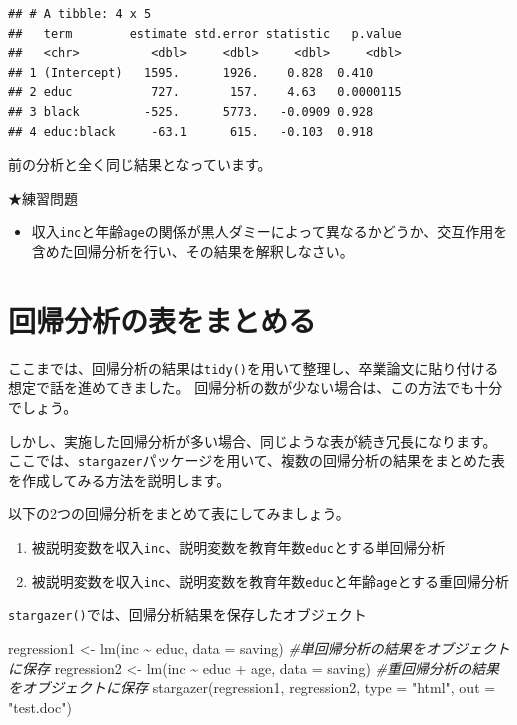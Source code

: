 \documentclass[
]{book}
\newenvironment{Shaded}{\begin{snugshade}}{\end{snugshade}}
\newcommand{\AttributeTok}[1]{\textcolor[rgb]{0.77,0.63,0.00}{#1}}
\newcommand{\CommentTok}[1]{\textcolor[rgb]{0.56,0.35,0.01}{\textit{#1}}}
\newcommand{\FunctionTok}[1]{\textcolor[rgb]{0.00,0.00,0.00}{#1}}
\newcommand{\NormalTok}[1]{#1}
\newcommand{\OtherTok}[1]{\textcolor[rgb]{0.56,0.35,0.01}{#1}}
\newcommand{\SpecialCharTok}[1]{\textcolor[rgb]{0.00,0.00,0.00}{#1}}
\newcommand{\StringTok}[1]{\textcolor[rgb]{0.31,0.60,0.02}{#1}}
\providecommand{\tightlist}{%
  \setlength{\itemsep}{0pt}\setlength{\parskip}{0pt}}
\begin{document}
\begin{verbatim}
## # A tibble: 4 x 5
##   term        estimate std.error statistic   p.value
##   <chr>          <dbl>     <dbl>     <dbl>     <dbl>
## 1 (Intercept)   1595.      1926.    0.828  0.410    
## 2 educ           727.       157.    4.63   0.0000115
## 3 black         -525.      5773.   -0.0909 0.928    
## 4 educ:black     -63.1      615.   -0.103  0.918
\end{verbatim}

前の分析と全く同じ結果となっています。

★練習問題

\begin{itemize}
\tightlist
\item
  収入\texttt{inc}と年齢\texttt{age}の関係が黒人ダミーによって異なるかどうか、交互作用を含めた回帰分析を行い、その結果を解釈しなさい。
\end{itemize}

\hypertarget{ux56deux5e30ux5206ux6790ux306eux8868ux3092ux307eux3068ux3081ux308b}{%
\section{回帰分析の表をまとめる}\label{ux56deux5e30ux5206ux6790ux306eux8868ux3092ux307eux3068ux3081ux308b}}

ここまでは、回帰分析の結果は\texttt{tidy()}を用いて整理し、卒業論文に貼り付ける想定で話を進めてきました。
回帰分析の数が少ない場合は、この方法でも十分でしょう。

しかし、実施した回帰分析が多い場合、同じような表が続き冗長になります。
ここでは、\texttt{stargazer}パッケージを用いて、複数の回帰分析の結果をまとめた表を作成してみる方法を説明します。

以下の2つの回帰分析をまとめて表にしてみましょう。

\begin{enumerate}
\def\labelenumi{\arabic{enumi}.}
\tightlist
\item
  被説明変数を収入\texttt{inc}、説明変数を教育年数\texttt{educ}とする単回帰分析
\item
  被説明変数を収入\texttt{inc}、説明変数を教育年数\texttt{educ}と年齢\texttt{age}とする重回帰分析
\end{enumerate}

\texttt{stargazer()}では、回帰分析結果を保存したオブジェクト

\begin{Shaded}
\begin{Highlighting}[]
\NormalTok{regression1 }\OtherTok{\textless{}{-}} \FunctionTok{lm}\NormalTok{(inc }\SpecialCharTok{\textasciitilde{}}\NormalTok{ educ, }\AttributeTok{data =}\NormalTok{ saving) }\CommentTok{\#単回帰分析の結果をオブジェクトに保存}
\NormalTok{regression2 }\OtherTok{\textless{}{-}} \FunctionTok{lm}\NormalTok{(inc }\SpecialCharTok{\textasciitilde{}}\NormalTok{ educ }\SpecialCharTok{+}\NormalTok{ age, }\AttributeTok{data =}\NormalTok{ saving) }\CommentTok{\#重回帰分析の結果をオブジェクトに保存}
\FunctionTok{stargazer}\NormalTok{(regression1, regression2, }\AttributeTok{type =} \StringTok{"html"}\NormalTok{, }\AttributeTok{out =} \StringTok{"test.doc"}\NormalTok{)}
\end{Highlighting}
\end{Shaded}
\end{document}
